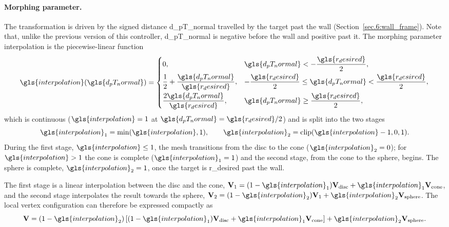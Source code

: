 \paragraph{Morphing parameter.}
The transformation is driven by the signed distance \gls{d_pT_normal} travelled by the target past the wall (Section~\ref{sec.6:wall_frame}). Note that, unlike the previous version of this controller, \gls{d_pT_normal} is negative before the wall and positive past it. The morphing parameter \gls{interpolation} is the piecewise-linear function
\begin{equation}
    \gls{interpolation}(\gls{d_pT_normal}) =
    \begin{cases}
        0, & \gls{d_pT_normal} < -\dfrac{\gls{r_desired}}{2},\\[6pt]
        \dfrac{1}{2} + \dfrac{\gls{d_pT_normal}}{\gls{r_desired}}, & -\dfrac{\gls{r_desired}}{2} \le \gls{d_pT_normal} < \dfrac{\gls{r_desired}}{2},\\[8pt]
        \dfrac{2\gls{d_pT_normal}}{\gls{r_desired}}, & \gls{d_pT_normal} \geq \dfrac{\gls{r_desired}}{2},
    \end{cases}
    \label{eq.6:morphing_parameter}
\end{equation}
which is continuous ($\gls{interpolation}=1$ at $\gls{d_pT_normal}=\gls{r_desired}/2$) and is split into the two stages
\begin{equation}
    \gls{interpolation}_1=\min(\gls{interpolation},1),
    \qquad
    \gls{interpolation}_2=\operatorname{clip}(\gls{interpolation}-1,0,1).
\end{equation}
During the first stage, $\gls{interpolation}\le1$, the mesh transitions from the disc to the cone ($\gls{interpolation}_2=0$); for $\gls{interpolation}>1$ the cone is complete ($\gls{interpolation}_1=1$) and the second stage, from the cone to the sphere, begins. The sphere is complete, $\gls{interpolation}_2=1$, once the target is \gls{r_desired} past the wall.

The first stage is a linear interpolation between the disc and the cone, $\mathbf{V}_{1}=(1-\gls{interpolation}_1)\mathbf{V}_{\mathrm{disc}}+\gls{interpolation}_1\mathbf{V}_{\mathrm{cone}}$, and the second stage interpolates the result towards the sphere, $\mathbf{V}_{2}=(1-\gls{interpolation}_2)\mathbf{V}_{1}+\gls{interpolation}_2\mathbf{V}_{\mathrm{sphere}}$. The local vertex configuration can therefore be expressed compactly as
\begin{equation}
    \mathbf{V}
    =
    (1-\gls{interpolation}_2)
    \left[
    (1-\gls{interpolation}_1)\mathbf{V}_{\mathrm{disc}}
    +
    \gls{interpolation}_1\mathbf{V}_{\mathrm{cone}}
    \right]
    +
    \gls{interpolation}_2\mathbf{V}_{\mathrm{sphere}}.
    \label{eq.6:blend}
\end{equation}

